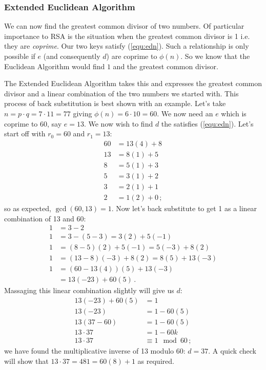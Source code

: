 \documentclass[]{scrartcl}
\theoremstyle{definition}
\let\oldref\ref
\renewcommand{\ref}[1]{(\oldref{#1})}
\begin{document}
\subsubsection{Extended Euclidean Algorithm}
We can now find the greatest common divisor of two numbers. Of particular importance to RSA is the situation when the greatest common divisor is 1 i.e. they are \textit{coprime}. Our two keys satisfy \ref{equ:edn}.
Such a relationship is only possible if $e$ (and consequently $d$) are coprime to $\phi(n)$. So we know that the Euclidean Algorithm would find $1$ and the greatest common divisor. 

The Extended Euclidean Algorithm takes this and expresses the greatest common divisor and a linear combination of the two numbers we started with. This process of back substitution is best shown with an example. Let's take $n = p\cdot q = 7\cdot11 = 77$ giving $\phi(n) = 6\cdot 10 = 60$. We now need an $e$ which is coprime to 60, say $e = 13$. We now wish to find $d$ the satisfies \ref{equ:edn}. Let's start off with $r_0 = 60$ and $r_1 = 13$:
\begin{align*}
    60 &= 13(4) + 8 \\
    13 &= 8(1) + 5 \\
    8  &= 5(1) + 3 \\
    5  &= 3(1) + 2 \\
    3  &= 2(1) + 1 \\
    2  &= 1(2) + 0\,;
\end{align*}
so as expected, $\gcd(60,13) = 1$. Now let's back substitute to get 1 as a linear combination of 13 and 60:
\begin{align*}
    1  &= 3 - 2 \\
    1  &= 3 - (5-3) = 3(2) + 5(-1) \\
    1  &= (8-5)(2) + 5(-1) = 5(-3) + 8(2)\\
    1  &= (13-8)(-3) + 8(2) = 8(5) + 13(-3) \\
    1  &= (60-13(4))(5) + 13(-3) \\
       &= 13(-23) + 60(5)\,.
\end{align*}
Massaging this linear combination slightly will give us $d$:
\begin{align*}
    13(-23) + 60(5) &= 1 \\
    13(-23) &= 1 - 60(5) \\
    13(37-60) &= 1 - 60(5) \\
    13\cdot 37 &= 1 - 60k \\
    13 \cdot 37 &\equiv 1 \mod 60\,;
\end{align*}
we have found the multiplicative inverse of 13 modulo 60: $d=37$. A quick check will show that $13\cdot37=481 = 60(8) + 1$ as required.
\end{document}
